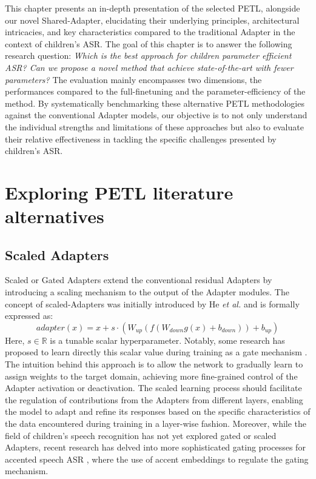 This chapter presents an in-depth presentation of the selected \ac{PETL}, alongside our novel Shared-Adapter, elucidating their underlying principles, architectural intricacies, and key characteristics compared to the traditional Adapter in the context of children's \ac{ASR}. The goal of this chapter is to answer the following research question: \textit{Which is the best approach for children parameter efficient \ac{ASR}? Can we propose a novel method that achieve state-of-the-art with fewer parameters?} The evaluation mainly encompasses two dimensions, the performances compared to the full-finetuning and the parameter-efficiency of the method. By systematically benchmarking these alternative \ac{PETL} methodologies against the conventional Adapter models, our objective is to not only understand the individual strengths and limitations of these approaches but also to evaluate their relative effectiveness in tackling the specific challenges presented by children's \ac{ASR}.

\section{Exploring PETL literature alternatives}
\label{section:petl_alt}
\subsection{Scaled Adapters}
Scaled or Gated Adapters extend the conventional residual Adapters by introducing a scaling mechanism to the output of the Adapter modules. The concept of scaled-Adapters was initially introduced by He \textit{et al.} \cite{he2022towards} and is formally expressed as:
\begin{equation}
    adapter(x) = x + s \cdot (W_{up}(f(W_{down}g(x) + b_{down})) + b_{up})    
\end{equation}
Here, $s \in \mathbb{R}$ is a tunable scalar hyperparameter. Notably, some research has proposed to learn directly this scalar value during training as a gate mechanism \cite{mao-etal-2022-unipelt}. The intuition behind this approach is to allow the network to gradually learn to assign weights to the target domain, achieving more fine-grained control of the Adapter activation or deactivation. The scaled learning process should facilitate the regulation of contributions from the Adapters from different layers, enabling the model to adapt and refine its responses based on the specific characteristics of the data encountered during training in a layer-wise fashion. Moreover, while the field of children's speech recognition has not yet explored gated or scaled Adapters, recent research has delved into more sophisticated gating processes for accented speech \ac{ASR} \cite{gong2022layer}, where the use of accent embeddings to regulate the gating mechanism.

